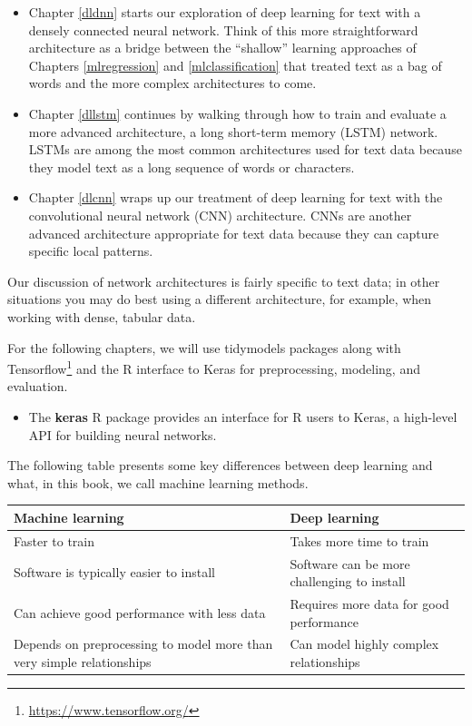 \documentclass[
]{krantz}
\DeclareRobustCommand{\href}[2]{#2\footnote{\url{#1}}}
\renewcommand{\href}[2]{#2\footnote{\url{#1}}}
\newenvironment{rmdblock}[1]
  {\begin{shaded*}
  \begin{itemize}[left = -1cm, labelsep = 1cm]
  \renewcommand{\labelitemi}{
    \raisebox{-.7\height}[0pt][0pt]{
      {\setkeys{Gin}{width=3em,keepaspectratio}\texttt{[image: images/\#1]}}
    }
  }
 
  \item
  }
  {
  \end{itemize}
  \end{shaded*}
  }
\newenvironment{rmdpackage}
  {\begin{rmdblock}{package}}
  {\end{rmdblock}}
\begin{document}
\begin{itemize}
\item
  Chapter \ref{dldnn} starts our exploration of deep learning for text with a densely connected neural network. Think of this more straightforward architecture as a bridge between the ``shallow'' learning approaches of Chapters \ref{mlregression} and \ref{mlclassification} that treated text as a bag of words and the more complex architectures to come.
\item
  Chapter \ref{dllstm} continues by walking through how to train and evaluate a more advanced architecture, a long short-term memory (LSTM) network. LSTMs are among the most common architectures used for text data because they model text as a long sequence of words or characters.
\item
  Chapter \ref{dlcnn} wraps up our treatment of deep learning for text with the convolutional neural network (CNN) architecture. CNNs are another advanced architecture appropriate for text data because they can capture specific local patterns.
\end{itemize}

Our discussion of network architectures is fairly specific to text data; in other situations you may do best using a different architecture, for example, when working with dense, tabular data.

For the following chapters, we will use tidymodels packages along with \href{https://www.tensorflow.org/}{Tensorflow} and the R interface to Keras \citep{R-keras} for preprocessing, modeling, and evaluation.

\thispagestyle{myheadings}

\begin{rmdpackage}
The \textbf{keras} R package provides an interface for R users to Keras,
a high-level API for building neural networks.
\end{rmdpackage}

The following table presents some key differences between deep learning and what, in this book, we call machine learning methods.

\begin{tabular}{>{\raggedright\arraybackslash}p{55mm}>{\raggedright\arraybackslash}p{55mm}}
\toprule
\textbf{Machine learning} & \textbf{Deep learning}\\
\midrule
Faster to train & Takes more time to train\\
Software is typically easier to install & Software can be more challenging to install\\
Can achieve good performance with less data & Requires more data for good performance\\
Depends on preprocessing to model more than very simple relationships & Can model highly complex relationships\\
\bottomrule
\end{tabular}
\end{document}
